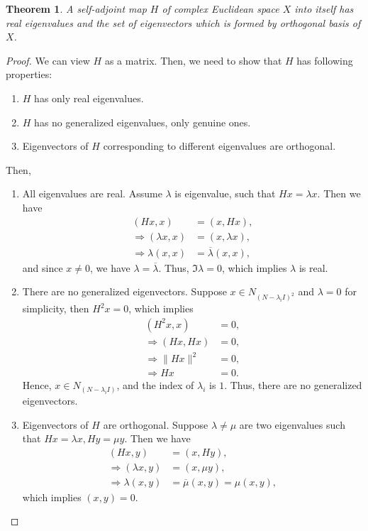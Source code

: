 \documentclass[11pt]{book}
\newtheorem{theorem}{Theorem}[chapter]
\theoremstyle{definition}
\numberwithin{equation}{chapter}
\begin{document}
\begin{theorem}\label{hermitian_eigenvalue_theorem}
A self-adjoint map $H$ of complex Euclidean space $X$ into itself has real eigenvalues and the set of eigenvectors which is formed by orthogonal basis of $X$.
\end{theorem}
\begin{proof}
We can view $H$ as a matrix. Then, we need to show that $H$ has following properties:
\begin{enumerate}[label=(\alph*)]
    \item $H$ has only real eigenvalues.
    
    \item $H$ has no generalized eigenvalues, only genuine ones.
    
    \item Eigenvectors of $H$ corresponding to different eigenvalues are orthogonal.
\end{enumerate}
Then, 
\begin{enumerate}[label=(\alph*)]
    \item All eigenvalues are real. Assume $\lambda$ is eigenvalue, such that $Hx = \lambda x$. Then we have
    \begin{align*}
        (Hx, x) & = (x, Hx), \\
        \Rightarrow (\lambda x, x) & = (x, \lambda x), \\
        \Rightarrow \lambda (x, x) & = \overline{\lambda} (x, x),
    \end{align*}
    and since $x \neq 0$, we have $\lambda = \overline{\lambda}$. Thus, $\Im \lambda = 0$, which implies $\lambda$ is real.
    \item There are no generalized eigenvectors. Suppose $x\in N_{(N - \lambda_i I)^2}$ and $\lambda = 0$ for simplicity, then $H^2 x = 0$, which implies
    \begin{align*}
        (H^2 x, x) & = 0, \\
        \Rightarrow (Hx, Hx) & = 0, \\
        \Rightarrow \|Hx\|^2 & = 0, \\
        \Rightarrow Hx & = 0.
    \end{align*}
    Hence, $x\in N_{(N - \lambda_i I)}$, and the index of $\lambda_i$ is $1$. Thus, there are no generalized eigenvectors.
    \item Eigenvectors of $H$ are orthogonal. Suppose $\lambda \neq \mu$ are two eigenvalues such that $Hx = \lambda x, Hy = \mu y$. Then we have
    \begin{align*}
        (Hx, y) & = (x, Hy), \\
        \Rightarrow (\lambda x, y) & = (x, \mu y), \\
        \Rightarrow \lambda(x, y) & = \overline{\mu} (x, y) = \mu (x, y),
    \end{align*}
    which implies $(x,y) = 0$. 
\end{enumerate}
\end{proof}
\end{document}
